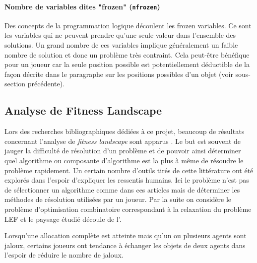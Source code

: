 \documentclass[../main.tex]{subfiles}
\begin{document}
	\paragraph{Nombre de variables dites "frozen" (\texttt{nfrozen})}{Des concepts de la programmation logique découlent les frozen variables. Ce sont les variables qui ne peuvent prendre qu'une seule valeur dans l'ensemble des solutions. Un grand nombre de ces variables implique généralement un faible nombre de solution et donc un problème très contraint. Cela peut-être bénéfique pour un joueur car la seule position possible est potentiellement déductible de la façon décrite dans le paragraphe sur les positions possibles d'un objet (voir sous-section précédente).}
	
	\subsection{Analyse de Fitness Landscape}
	Lors des recherches bibliographiques dédiées à ce projet, beaucoup de résultats concernant l'analyse de \textit{fitness landscape} sont apparus \cite{pitzer, garnier, stadler}. Le but est souvent de jauger la difficulté de résolution d'un problème et de pouvoir ainsi déterminer quel algorithme ou composante d'algorithme est la plus à même de résoudre le problème rapidement. Un certain nombre d'outils tirés de cette littérature ont été explorés dans l'espoir d'expliquer les ressentis humains. Ici le problème n'est pas de sélectionner un algorithme comme dans ces articles mais de déterminer les méthodes de résolution utilisées par un joueur. Par la suite on considère le problème d'optimisation combinatoire correspondant à la relaxation du problème \textsc{LEF} et le paysage étudié découle de l'.
	
	\begin{observation}
	\label{obs-swap}
	Lorsqu'une allocation complète est atteinte mais qu'un ou plusieurs agents sont jaloux, certains joueurs ont tendance à échanger les objets de deux agents dans l'espoir de réduire le nombre de jaloux.
	\end{observation}
	
\end{document}
